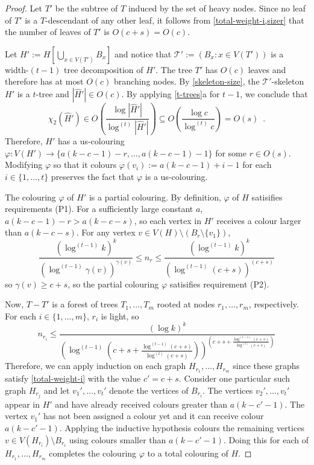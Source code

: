 \documentclass[kpfonts]{patmorin}
\newcommand{\uqs}{\chi_2}
\theoremstyle{named}
\newcommand{\weirdref}[2]{\cref{#1}#2}
\begin{document}
\begin{proof}
    Let $T'$ be the subtree of $T$ induced by the set of heavy nodes.  Since no leaf of $T'$ is a $T$-descendant of any other leaf, it follows from \cref{total-weight-i,sizer} that the number of leaves of $T'$ is $O(c+s)=O(c)$.

    Let $H':=H[\bigcup_{x\in V(T')} B_x]$ and notice that $\mathcal{T}':=(B_x:x\in V(T'))$ is a width-$(t-1)$ tree decomposition of $H'$. The tree $T'$ has $O(c)$ leaves and therefore has at most $O(c)$ branching nodes. By \cref{skeleton-size}, the $\mathcal{T}'$-skeleton $\hat{H'}$ is a $t$-tree and $|\hat{H}'|\in O(c)$.  By applying \weirdref{t-trees}{a} for $t-1$, we conclude that
    \[
       \uqs(\hat{H}')\in
       O\left(\frac{\log|\hat{H}'|}{\log^{(t)}|\hat{H}'|}\right)
       \subseteq O\left(\frac{\log c}{\log^{(t)} c}\right) = O(s) \enspace .
    \]
    Therefore, $H'$ has a us-colouring $\varphi:V(H')\to \{a(k-c-1)-r,\ldots,a(k-c-1)-1\}$ for some $r\in O(s)$. Modifying $\varphi$ so that it colours $\varphi(v_i):=a(k-c-1)+i-1$ for each $i\in\{1,\ldots,t\}$ preserves the fact that $\varphi$ is a us-colouring.

    The colouring $\varphi$ of $H'$ is a partial colouring. By definition, $\varphi$ of $H$ satisifies requirements (P1). For a sufficiently large constant $a$, $a(k-c-1)-r > a(k-c-s)$, so each vertex in $H'$ receives a colour larger than $a(k-c-s)$.  For any vertex $v\in V(H)\setminus (B_r\setminus \{v_1\})$,
    \[ \frac{(\log^{(t-1)} k)^k}{(\log^{(t-1)}\gamma(v))^{\gamma(v)}}
         \le n_r
         \le \frac{(\log^{(t-1)} k)^k}{(\log^{(t-1)}(c+s))^{(c+s)}}
    \]
    so $\gamma(v)\ge c+s$, so the partial colouring $\varphi$ satisifies requirement (P2).

   Now, $T-T'$ is a forest of trees $T_1,\ldots,T_m$ rooted at nodes $r_1,\ldots,r_m$, respectively.
   For each $i\in\{1,\ldots,m\}$, $r_i$ is light, so
   \[
       n_{r_i} \le \frac{(\log k)^k}{
        \left(
            \log^{(t-1)}
                \left(
                   c+s+\tfrac{\log^{(t-1)} (c+s)}{\log^{(t)}(c+s)}
               \right)
        \right)^{\left(
           c+s+\tfrac{\log^{(t-1)} (c+s)}{\log^{(t)}(c+s)}
       \right)}
       }
   \]
   Therefore, we can apply induction on each graph $H_{r_1},\ldots,H_{r_m}$ since these graphs satisfy \cref{total-weight-i} with the value $c'=c+s$.
   Consider one particular such graph $H_{r_j}$ and let $v_1',\ldots,v_t'$ denote the vertices of $B_{r_i}$.  The vertices $v_2',\ldots,v_t'$ appear in $H'$ and have already received colours greater than $a(k-c'-1)$.  The vertex $v_1'$ has not been assigned a colour yet and it can receive colour $a(k-c'-1)$.  Applying the inductive hypothesis colours the remaining vertices $v\in V(H_{r_i})\setminus B_{r_i}$ using colours smaller than $a(k-c'-1)$.  Doing this for each of $H_{r_1},\ldots,H_{r_m}$ completes the colouring $\varphi$ to a total colouring of $H$.


\end{proof}
\end{document}
